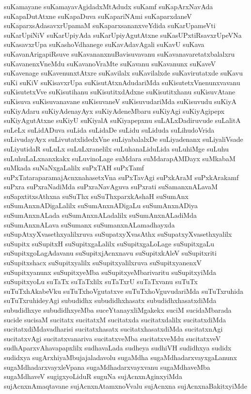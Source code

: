 {suKamayane
suKamayavAgidadxMtAdudx
suKamf
suKapArxNavAda
suKapaDutAtxne
suKapaDuva
suKapariNAmi
suKaparxdaneV
suKaparxsAdasavxrUpamaM
suKaparxsananxveYdida
suKarUpameVti
suKarUpiNiV
suKarUpiyAda
suKarUpiyAgutAtxne
suKasUPxtiRsavxrUpeVNa
suKasavxrUpa
suKashoVdhanege
suKavAdavAgali
suKavU
suKava
suKavanArigapiRsuve
suKavananxnuBavisuvavanu
suKavanavaretatxbalalxru
suKavanenxVneMdu
suKavanoVraMte
suKavanu
suKavanunx
suKaveV
suKavenage
suKavenunxtAtxre
suKavilalx
suKavilalxde
suKavirutatxde
suKavu
suKi
suKiV
suKisavxrUpa
suKisutAtxnAdudariMda
suKisutetxVnenunxvavanu
suKisutetxVve
suKisutihanu
suKisutitxdAdxne
suKisutitxhanu
suKisuvAtane
suKisuva
suKisuvanavane
suKisuvaneV
suKisuvudariMda
suKisuvudu
suKiyA
suKiyAdaru
suKiyAdenayAyx
suKiyAdeneMbaru
suKiyAgi
suKiyAgipepx
suKiyAgutAtxne
suKiyU
suKiyalA
suKiyapepxnu
suLALxDadiruvude
suLalitA
suLeLx
suLidADuva
suLida
suLidaDe
suLidu
suLiduda
suLihudoVrida
suLivudayAyx
suLivutatxlidedxVne
suLiyabalalxDe
suLiyadenanx
suLiyaliVsade
suLiyutidaR
suLuLx
suLuLxranelilx
suLuhanaLiduLida
suLuhiMge
suLuhu
suLuhuLaLxnanxkakx
suLuvinoLage
suMdara
suMdarapAMDayx
suMkabaM
suMkada
suNaNxgaLalilx
suPxTAH
suPxTamf
suPxTataraparamajAcnxnahasetxVna
suPxTavAgi
suPxkAraM
suPxkArakamf
suPxra
suPxraNadiMda
suPxraNavAguva
suPxrati
suSamanxnALavaM
suSapxtitxsAthxna
suSuThx
suSuThxparxkAshaH
suSumAnx
suSumAnxnADigaLalilx
suSumAnxnADigaLu
suSumAnxnADiya
suSumAnxnALada
suSumAnxnALadalilx
suSumAnxnALadiMda
suSumAnxnALava
suSumanx
suSumanxnALamadhayxda
suSupAtxyXvasethxyalilxruva
suSupatxyXvasAthx
suSupatxyXvasethxyalilx
suSupitx
suSupitxH
suSupitxgaLalilx
suSupitxgaLoLage
suSupitxgaLu
suSupitxgoLagAdavanu
suSupitxjAcnxnavu
suSupitxkAleV
suSupitxriti
suSupitxshacx
suSupitxyalilx
suSupitxyalilxruva
suSupitxyanenxV
suSupitxyanunx
suSupitxyeMba
suSupitxyeMbarivaritu
suSupitxyiMda
suSupitxyoLu
suTaTx
suTaTxlilx
suTaTxrU
suTaTxvanu
suTuTx
suTuTxhAkabeVku
suTuTxhoVgutatxve
suTuTxhoVguvudariMda
suTuTxruhida
suTuTxruhideyAgi
subudidhx
subudidhxhasatx
subudidhxhasatxdiMda
subudidhxye
subudidhxyeMba
suceYtanayxliMgakekx
suciM
sucidaMbarada
sucide
sucisaM
sucitatx
sucitatxM
sucitatxda
sucitatxdalilx
sucitatxdiMda
sucitatxdiMdavadharisi
sucitatxhasatx
sucitatxhasatxdiMda
sucitatxnAgi
sucitatxvAgi
sucitatxvanariva
sucitatxveMba
sucitatxveMdu
sucitatxveV
sudhAparxvAhavapapxlilx
sudhavaLada
sudheya
sudhiVH
sudidhxya
sudidx
sudidxya
sugArxhiyaMbujajaladavolu
sugaMdha
sugaMdhadarxvayxgaLanunx
sugaMdhadarxvayxleVpana
sugaMdhadarxvayxvanu
sugaMdhaveMba
sugaMdhaveV
sugigxyoLiduR
suguNa
sujAcnxnAginxyiMda
sujAcnxnAmaqtavane
sujAcnxnAtamxnoVvalu
sujAcnxna
sujAcnxnaBakitxyiMde
}
